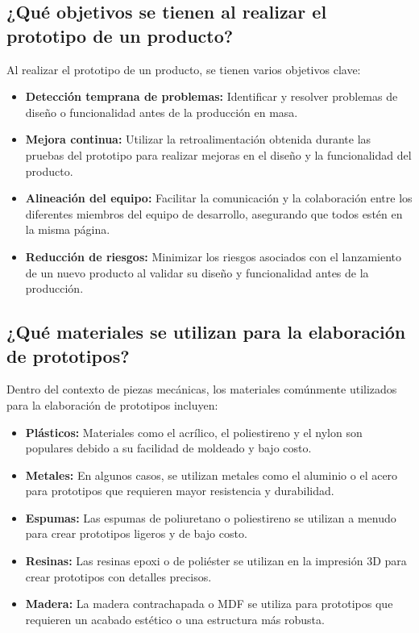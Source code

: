   \subsection{¿Qué objetivos se tienen al realizar el prototipo de un producto?}

  Al realizar el prototipo de un producto, se tienen varios objetivos clave:

  \begin{itemize}
    \item \textbf{Detección temprana de problemas:} Identificar y resolver problemas de diseño o funcionalidad antes de la producción en masa.
    \item \textbf{Mejora continua:} Utilizar la retroalimentación obtenida durante las pruebas del prototipo para realizar mejoras en el diseño y la funcionalidad del producto.
    \item \textbf{Alineación del equipo:} Facilitar la comunicación y la colaboración entre los diferentes miembros del equipo de desarrollo, asegurando que todos estén en la misma página.
    \item \textbf{Reducción de riesgos:} Minimizar los riesgos asociados con el lanzamiento de un nuevo producto al validar su diseño y funcionalidad antes de la producción.
  \end{itemize}

  \subsection{¿Qué materiales se utilizan para la elaboración de prototipos?}

  Dentro del contexto de piezas mecánicas, los materiales comúnmente utilizados para la elaboración de prototipos incluyen:

  \begin{itemize}
    \item \textbf{Plásticos:} Materiales como el acrílico, el poliestireno y el nylon son populares debido a su facilidad de moldeado y bajo costo.
    \item \textbf{Metales:} En algunos casos, se utilizan metales como el aluminio o el acero para prototipos que requieren mayor resistencia y durabilidad.
    \item \textbf{Espumas:} Las espumas de poliuretano o poliestireno se utilizan a menudo para crear prototipos ligeros y de bajo costo.
    \item \textbf{Resinas:} Las resinas epoxi o de poliéster se utilizan en la impresión 3D para crear prototipos con detalles precisos.
    \item \textbf{Madera:} La madera contrachapada o MDF se utiliza para prototipos que requieren un acabado estético o una estructura más robusta.
  \end{itemize}

